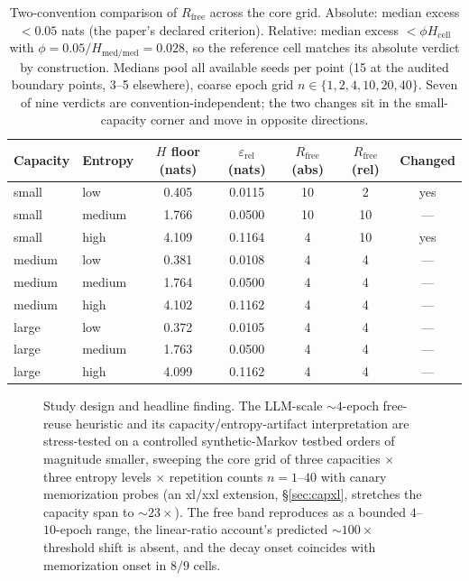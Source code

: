 \documentclass[11pt]{article}
\begin{document}
\begin{table}[htbp]
\centering
\caption{Two-convention comparison of $R_{\mathrm{free}}$ across the core grid.
Absolute: median excess $< 0.05$ nats (the paper's declared criterion). Relative:
median excess $< \phi H_{\mathrm{cell}}$ with $\phi = 0.05/H_{\mathrm{med/med}} =
0.028$, so the reference cell matches its absolute verdict by construction.
Medians pool all available seeds per point (15 at the audited boundary points,
3--5 elsewhere), coarse epoch grid $n \in \{1,2,4,10,20,40\}$. Seven of nine
verdicts are convention-independent; the two changes sit in the small-capacity
corner and move in opposite directions.}
\label{tab:twoconv}
\scriptsize
\begin{tabular}{@{}llccccc@{}}
\toprule
Capacity & Entropy & $H$ floor (nats) & $\varepsilon_{\mathrm{rel}}$ (nats) & $R_{\mathrm{free}}$ (abs) & $R_{\mathrm{free}}$ (rel) & Changed \\
\midrule
small & low    & 0.405 & 0.0115 & 10 & 2  & yes \\
small & medium & 1.766 & 0.0500 & 10 & 10 & --- \\
small & high   & 4.109 & 0.1164 & 4  & 10 & yes \\
\midrule
medium & low    & 0.381 & 0.0108 & 4 & 4 & --- \\
medium & medium & 1.764 & 0.0500 & 4 & 4 & --- \\
medium & high   & 4.102 & 0.1162 & 4 & 4 & --- \\
\midrule
large & low    & 0.372 & 0.0105 & 4 & 4 & --- \\
large & medium & 1.763 & 0.0500 & 4 & 4 & --- \\
large & high   & 4.099 & 0.1162 & 4 & 4 & --- \\
\bottomrule
\end{tabular}
\end{table}

\begin{figure}[t]
\centering
{}
\caption{Study design and headline finding. The LLM-scale ${\sim}4$-epoch free-reuse heuristic and its capacity/entropy-artifact interpretation are stress-tested on a controlled synthetic-Markov testbed orders of magnitude smaller, sweeping the core grid of three capacities $\times$ three entropy levels $\times$ repetition counts $n=1$--$40$ with canary memorization probes (an xl/xxl extension, \S\ref{sec:capxl}, stretches the capacity span to ${\sim}23\times$). The free band reproduces as a bounded $4$--$10$-epoch range, the linear-ratio account's predicted ${\sim}100\times$ threshold shift is absent, and the decay onset coincides with memorization onset in $8/9$ cells.}
\label{fig:scheme}
\end{figure}
\end{document}
